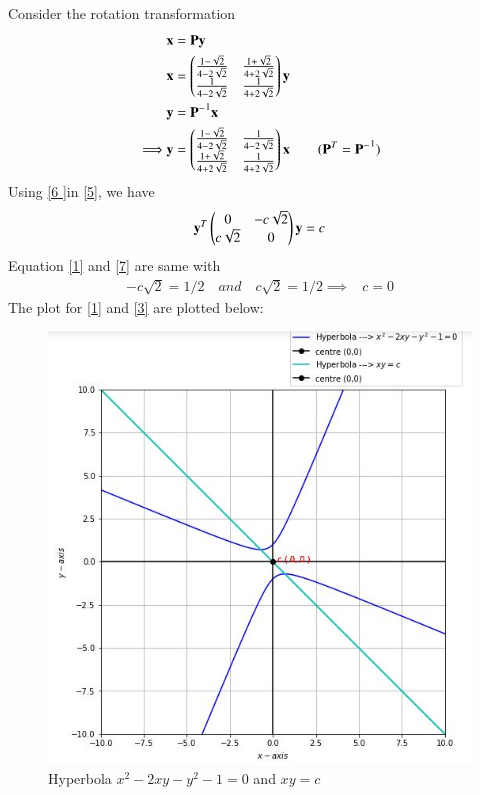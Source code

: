 \documentclass[journal,12pt,twocolumn]{IEEEtran}
\begin{document}
Consider the rotation transformation
\begin{align}
	& \mathbf{x} = \mathbf{P}\mathbf{y} \\
	& \mathbf{x} = \begin{pmatrix}\frac{1-\sqrt{2}}{4-2\sqrt{2}} & \frac{1+\sqrt{2}}{4+2\sqrt{2}} \\ \frac{1}{4-2\sqrt{2}} & \frac{1}{4+2\sqrt{2}}\end{pmatrix}\mathbf{y} \\
	& \mathbf{y} = \mathbf{P^-}^1\mathbf{x} \\
\implies & \mathbf{y} =\begin{pmatrix}\frac{1-\sqrt{2}}{4-2\sqrt{2}} & \frac{1}{4-2\sqrt{2}} \\ \frac{1+\sqrt{2}}{4+2\sqrt{2}}  & \frac{1}{4+2\sqrt{2}}\end{pmatrix} \mathbf{x} \qquad (\mathbf{P}^T = \mathbf{P^-}^1) \label{6 }
\end{align}
Using \eqref{6 }in \eqref{5}, we have
\begin{align}
	\mathbf{y}^T\begin{pmatrix}0 & -c\sqrt{2} \\ c\sqrt{2} & 0\end{pmatrix}\mathbf{y} = c \label{7}
\end{align}
Equation \eqref{1} and \eqref{7} are same with 
\begin{align}
- c\sqrt{2} = 1/2 \quad and \quad  c\sqrt{2} = 1/2 \implies & c= 0
\end{align}
The plot for \eqref{1} and \eqref{3} are plotted below:

\begin{figure}[!htb]

	
	\includegraphics[width=\columnwidth]{Assignment5_1.jpg}
	
	\caption{Hyperbola $x^2-2xy-y^2-1=0$ and $xy =c$}
	
	\label{fig:1}
	
\end{figure}
\end{document}
